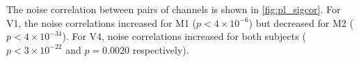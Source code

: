 The noise correlation between pairs of channels is shown in \autoref{fig:pl_sigcor}.
For \ac{V1}, the noise correlations increased for \ac{M1} ($p < 4 \times 10^{-6}$) but decreased for \ac{M2} ($p < 4 \times 10^{-34}$).
For \ac{V4}, noise correlations increased for both subjects ($p < 3 \times 10^{-22}$ and $p=0.0020$ respectively).

%
%
%


